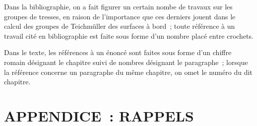 Dans la bibliographie, on a fait figurer un certain nombe de travaux sur les groupes de tresses, en raison de l'importance que ces derniers jouent dans le calcul des groupes de Teichmüller des surfaces à bord~; toute référence à un travail cité en bibliographie est faite sous forme d'un nombre placé entre crochets. 

Dans le texte, les références à un énoncé sont faites sous forme d'un chiffre romain désignant le chapitre suivi de nombres désignant le paragraphe~; lorsque la référence concerne un paragraphe du même chapitre, on omet le numéro du dit chapitre.

\chapter*{APPENDICE~: RAPPELS}
\section*{}

